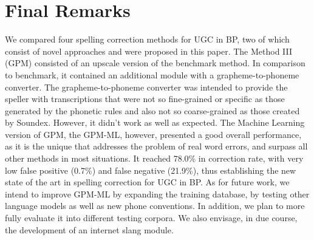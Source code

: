 \section{Final Remarks}\label{sec:speller-final-remarks}

We compared four spelling correction methods for UGC in BP, two of which consist of novel approaches and were proposed in this paper. The Method III (GPM) consisted of an upscale version of the benchmark method. In comparison to benchmark, it contained an additional module with a grapheme-to-phoneme converter. The grapheme-to-phoneme converter was intended to provide the speller with transcriptions that were not so fine-grained or specific as those generated by the phonetic rules and also not so coarse-grained as those created by Soundex. However, it didn't work as well as expected.  The Machine Learning version of GPM, the GPM-ML, however, presented a good overall performance, as it is the unique that addresses the problem of real word errors, and surpass all other methods in most situations.  It reached 78.0\% in correction rate, with very low false positive (0.7\%) and false negative (21.9\%), thus establishing the new state of the art in spelling correction for UGC in BP. As for future work, we intend to improve GPM-ML by expanding the training database, by testing other language models as well as new phone conventions. In addition, we plan to more fully evaluate it into different testing corpora. We also envisage, in due course, the development of an internet slang module.

